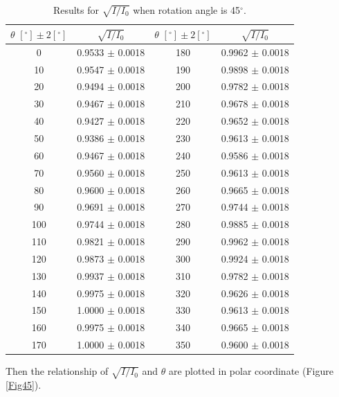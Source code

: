 \documentclass{article}
\begin{document}
\begin{table}[H]\centering
\begin{tabular}{cc||cc}
\toprule
$\theta\,\,[^\circ] \pm 2[^\circ]$ & $\sqrt{I/I_0}$ & $\theta\,\,[^\circ] \pm 2[^\circ]$ & $\sqrt{I/I_0}$\\
\midrule
    0     & 0.9533  $\pm$ 0.0018  & 180   & 0.9962  $\pm$ 0.0018 \\
    10    & 0.9547  $\pm$ 0.0018  & 190   & 0.9898  $\pm$ 0.0018 \\
    20    & 0.9494  $\pm$ 0.0018  & 200   & 0.9782  $\pm$ 0.0018 \\
    30    & 0.9467  $\pm$ 0.0018  & 210   & 0.9678  $\pm$ 0.0018 \\
    40    & 0.9427  $\pm$ 0.0018  & 220   & 0.9652  $\pm$ 0.0018 \\
    50    & 0.9386  $\pm$ 0.0018  & 230   & 0.9613  $\pm$ 0.0018 \\
    60    & 0.9467  $\pm$ 0.0018  & 240   & 0.9586  $\pm$ 0.0018 \\
    70    & 0.9560  $\pm$ 0.0018  & 250   & 0.9613  $\pm$ 0.0018 \\
    80    & 0.9600  $\pm$ 0.0018  & 260   & 0.9665  $\pm$ 0.0018 \\
    90    & 0.9691  $\pm$ 0.0018  & 270   & 0.9744  $\pm$ 0.0018 \\
    100   & 0.9744  $\pm$ 0.0018  & 280   & 0.9885  $\pm$ 0.0018 \\
    110   & 0.9821  $\pm$ 0.0018  & 290   & 0.9962  $\pm$ 0.0018 \\
    120   & 0.9873  $\pm$ 0.0018  & 300   & 0.9924  $\pm$ 0.0018 \\
    130   & 0.9937  $\pm$ 0.0018  & 310   & 0.9782  $\pm$ 0.0018 \\
    140   & 0.9975  $\pm$ 0.0018  & 320   & 0.9626  $\pm$ 0.0018 \\
    150   & 1.0000  $\pm$ 0.0018  & 330   & 0.9613  $\pm$ 0.0018 \\
    160   & 0.9975  $\pm$ 0.0018  & 340   & 0.9665  $\pm$ 0.0018 \\
    170   & 1.0000  $\pm$ 0.0018  & 350   & 0.9600  $\pm$ 0.0018 \\
\bottomrule
\end{tabular}
\caption{Results for $\sqrt{I/I_0}$ when rotation angle is 45$^\circ$.}\label{TableSqrt45}
\end{table}

Then the relationship of $\sqrt{I/I_0}$ and $\theta$ are plotted in polar coordinate (Figure \ref{Fig45}).
\end{document}
